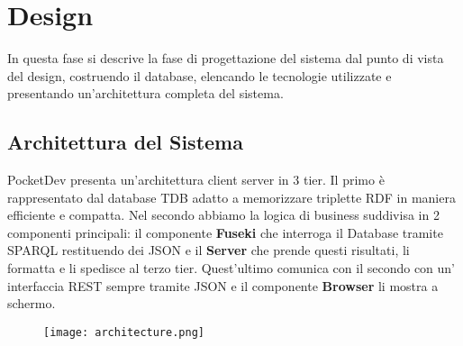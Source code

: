 \section{Design}
In questa fase si descrive la fase di progettazione del sistema dal punto di vista del design, costruendo il database, elencando le tecnologie utilizzate e presentando un'architettura completa del sistema.
\subsection{Architettura del Sistema}
PocketDev presenta un'architettura client server in 3 tier. Il primo è rappresentato dal database TDB adatto a memorizzare triplette RDF in maniera efficiente e compatta. Nel secondo abbiamo la logica di business suddivisa in 2 componenti principali: il componente \textbf{Fuseki} che interroga il Database tramite SPARQL restituendo dei JSON e il \textbf{Server} che prende questi risultati, li formatta e li spedisce al terzo tier. Quest'ultimo comunica con il secondo con un' interfaccia REST sempre tramite JSON e il componente \textbf{Browser} li mostra a schermo. 
\begin{figure}[H]
 \texttt{[image: architecture.png]}
\end{figure}
